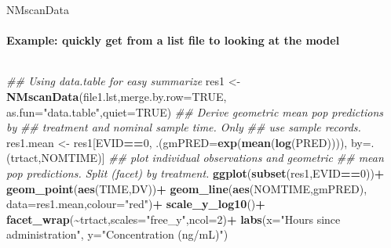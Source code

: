 \documentclass[
  8pt,
  ignorenonframetext,
  aspectratio=169]{beamer}
\newenvironment{Shaded}{\begin{snugshade}}{\end{snugshade}}
\newcommand{\CommentTok}[1]{\textcolor[rgb]{0.56,0.35,0.01}{\textit{#1}}}
\newcommand{\DataTypeTok}[1]{\textcolor[rgb]{0.13,0.29,0.53}{#1}}
\newcommand{\DecValTok}[1]{\textcolor[rgb]{0.00,0.00,0.81}{#1}}
\newcommand{\KeywordTok}[1]{\textcolor[rgb]{0.13,0.29,0.53}{\textbf{#1}}}
\newcommand{\NormalTok}[1]{#1}
\newcommand{\OperatorTok}[1]{\textcolor[rgb]{0.81,0.36,0.00}{\textbf{#1}}}
\newcommand{\OtherTok}[1]{\textcolor[rgb]{0.56,0.35,0.01}{#1}}
\newcommand{\StringTok}[1]{\textcolor[rgb]{0.31,0.60,0.02}{#1}}
\begin{document}
\begin{frame}[fragile]{NMscanData}
\protect\hypertarget{nmscandata-1}{}
\framesubtitle{Example: quickly get from a list file to looking at the model}

\footnotesize

\begin{columns}[T]
\begin{column}{0.45\textwidth}
\begin{Shaded}
\begin{Highlighting}[]
\CommentTok{\#\# Using data.table for easy summarize}
\NormalTok{res1 \textless{}{-}}\StringTok{ }\KeywordTok{NMscanData}\NormalTok{(file1.lst,}\DataTypeTok{merge.by.row=}\OtherTok{TRUE}\NormalTok{,}
                   \DataTypeTok{as.fun=}\StringTok{"data.table"}\NormalTok{,}\DataTypeTok{quiet=}\OtherTok{TRUE}\NormalTok{)}
\CommentTok{\#\# Derive geometric mean pop predictions by}
\CommentTok{\#\# treatment and nominal sample time. Only}
\CommentTok{\#\# use sample records.}
\NormalTok{res1.mean \textless{}{-}}
\StringTok{    }\NormalTok{res1[EVID}\OperatorTok{==}\DecValTok{0}\NormalTok{,}
\NormalTok{         .(}\DataTypeTok{gmPRED=}\KeywordTok{exp}\NormalTok{(}\KeywordTok{mean}\NormalTok{(}\KeywordTok{log}\NormalTok{(PRED)))),}
\NormalTok{         by=.(trtact,NOMTIME)]}
\CommentTok{\#\# plot individual observations and geometric}
\CommentTok{\#\# mean pop predictions. Split (facet) by treatment.}
\KeywordTok{ggplot}\NormalTok{(}\KeywordTok{subset}\NormalTok{(res1,EVID}\OperatorTok{==}\DecValTok{0}\NormalTok{))}\OperatorTok{+}
\StringTok{    }\KeywordTok{geom\_point}\NormalTok{(}\KeywordTok{aes}\NormalTok{(TIME,DV))}\OperatorTok{+}
\StringTok{    }\KeywordTok{geom\_line}\NormalTok{(}\KeywordTok{aes}\NormalTok{(NOMTIME,gmPRED),}
              \DataTypeTok{data=}\NormalTok{res1.mean,}\DataTypeTok{colour=}\StringTok{"red"}\NormalTok{)}\OperatorTok{+}
\StringTok{    }\KeywordTok{scale\_y\_log10}\NormalTok{()}\OperatorTok{+}
\StringTok{    }\KeywordTok{facet\_wrap}\NormalTok{(}\OperatorTok{\textasciitilde{}}\NormalTok{trtact,}\DataTypeTok{scales=}\StringTok{"free\_y"}\NormalTok{,}\DataTypeTok{ncol=}\DecValTok{2}\NormalTok{)}\OperatorTok{+}
\StringTok{    }\KeywordTok{labs}\NormalTok{(}\DataTypeTok{x=}\StringTok{"Hours since administration"}\NormalTok{,}
         \DataTypeTok{y=}\StringTok{"Concentration (ng/mL)"}\NormalTok{)}
\end{Highlighting}
\end{Shaded}
\end{column}

\begin{column}{0.55\textwidth}
\normalsize


\end{column}
\end{columns}
\end{frame}
\end{document}
